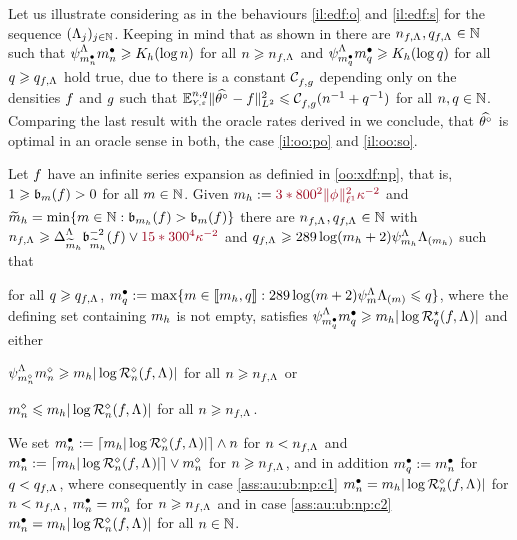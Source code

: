 \begin{il}\label{IL_FREQ_CIRCDECONV_UNKNOWN_IID_ORACLE_P}
Let us illustrate  considering as in  the behaviours \ref{il:edf:o} and \ref{il:edf:s} for the sequence $\Nsuite[j]{\iSv[j]}$.  
Keeping in mind that as shown in  there are ${\ssY}_{\xdf,\iSv},{\ssE}_{\xdf,\iSv}\in\Nz$ such that $\cmiSv[\sDi{\ssY}]\sDi{\ssY}\geq K_{\ydf}(\log\ssY)$  for all $\ssY\geq{\ssY}_{\xdf,\iSv}$ and $\cmiSv[\sDi{\ssE}]\sDi{\ssE}\geq K_{\ydf}(\log\ssE)$  for all $\ssE\geq{\ssE}_{\xdf,\iSv}$ hold true, due to  there is a constant $\cst{\xdf,\edf}$ depending only on the densities $\xdf$ and $\edf$ such that $\FuEx[\ssY,\ssE]{\rY,\rE}\VnormLp{\hxdf-\xdf}^2\leq \cst{\xdf,\edf}(\ssY^{-1}+\ssE^{-1})$ for all $\ssY,\ssE\in\Nz$.
Comparing the last result with the oracle rates derived in  we conclude, that $\hxdf$ is optimal in an oracle sense in both, the case \ref{il:oo:po} and  \ref{il:oo:so}.
\end{il}

\begin{as}\label{ass:au:ub:np}
Let $\xdf$  have an infinite series expansion as definied in \ref{oo:xdf:np}, that is, $1\geq \bias(\xdf)>0$ for all $\Di\in\Nz$.
Given   $\Di_{\ydf}:=\dr3*800^2\Vnormlp[1]{\fydf}^2\cpen^{-2}$ and $\tDi_{\ydf}=\min\{\Di\in\Nz:\bias[\Di_{\ydf}](\xdf)>\bias[\Di](\xdf)\}$ there are $\ssY_{\xdf,\iSv},\ssE_{\xdf,\iSv}\in\Nz$ with $\ssY_{\xdf,\iSv}\geq\DipenSv[\tDi_{\ydf}]\bias[\tDi_{\ydf}]^{-2}(\xdf)\vee\dr15*300^4\cpen^{-2}$ and $\ssE_{\xdf,\iSv}\geq289\log(\Di_{\ydf}+2)\cmiSv[\Di_{\ydf}]\miSv[\Di_{\ydf}]$ such that \begin{inparaenum}[i]\renewcommand{\theenumi}{\dgrau\rm(\alph{enumi})} \item\label{ass:au:ub:np:c0} for all $\ssE\geq\ssE_{\xdf,\iSv}$, $\sDi{\ssE}:=\max\{\Di\in\nset{\Di_{\ydf},\ssE}:289\log(\Di+2)\cmiSv[\Di]\miSv[\Di]\leq\ssE\}$, where the defining set containing $\Di_{\ydf}$ is not empty, satisfies $\cmiSv[\sDi{\ssE}]\sDi{\ssE}\geq \Di_{\ydf}|\log\mRa{\xdf,\iSv}|$ and  either 
\item\label{ass:au:ub:np:c1}
$\cmiSv[\aDi{\ssY}]\aDi{\ssY}\geq \Di_{\ydf}|\log\hRa{\xdf,\iSv}|$ 
for all
$\ssY\geq{\ssY}_{\xdf,\iSv}$ or \item\label{ass:au:ub:np:c2}  
$\aDi{\ssY}\leq  \Di_{\ydf}|\log\hRa{\xdf,\iSv}|$ for all
$\ssY\geq{\ssY}_{\xdf,\iSv}$. \end{inparaenum} We set 
$\sDi{\ssY}:= \ceil{\Di_{\ydf}|\log\hRa{\xdf,\iSv}|}\wedge\ssY$ for
$\ssY<\ssY_{\xdf,\iSv}$ and $\sDi{\ssY}:= \ceil{\Di_{\ydf}|\log\hRa{\xdf,\iSv}|}\vee\aDi{\ssY}$ for
$\ssY\geq\ssY_{\xdf,\iSv}$, and in addition $\sDi{\ssE}:=\sDi{\ssY}$
for $\ssE<\ssE_{\xdf,\iSv}$, where consequently in case
\ref{ass:au:ub:np:c1}  $\sDi{\ssY}= \Di_{\ydf}|\log\hRa{\xdf,\iSv}|$ for
$\ssY<\ssY_{\xdf,\iSv}$, $\sDi{\ssY}=\aDi{\ssY}$ for
$\ssY\geq\ssY_{\xdf,\iSv}$ and in case \ref{ass:au:ub:np:c2}
$\sDi{\ssY}= \Di_{\ydf}|\log\hRa{\xdf,\iSv}|$ for all $\ssY\in\Nz$.
\end{as}

